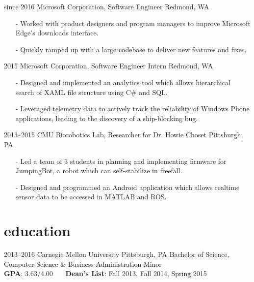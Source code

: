 \documentclass[]{friggeri-cv}
\begin{document}
    \begin{entrylist}
        \entrys
            {since 2016}
            {Microsoft Corporation, {\normalfont Software Engineer}}
            {Redmond, WA}
            {\begin{itemize}[leftmargin=*]
                \item[-] Worked with product designers and program managers to improve Microsoft Edge's downloads interface.
                \item[-] Quickly ramped up with a large codebase to deliver new features and fixes.
             \end{itemize}}
        \entrys
            {2015}
            {Microsoft Corporation, {\normalfont Software Engineer Intern}}
            {Redmond, WA}
            {\begin{itemize}[leftmargin=*]
                \item[-] Designed and implemented an analytics tool which allows hierarchical search of XAML file structure using C\# and SQL.
                \item[-] Leveraged telemetry data to actively track the reliability of Windows Phone applications, leading to the discovery of a ship-blocking bug.
             \end{itemize}}
        \entrys
            {2013--2015}
            {CMU Biorobotics Lab, {\normalfont Researcher for Dr. Howie Choset}}
            {Pittsburgh, PA}
            {\begin{itemize}[leftmargin=*]
                \item[-] Led a team of 3 students in planning and implementing firmware for JumpingBot, a robot which can self-stabilize in freefall.
                \item[-] Designed and programmed an Android application which allows realtime sensor data to be accessed in MATLAB and ROS.
            \end{itemize}}
    \end{entrylist}

    \section{education}

    \begin{entrylist}
        \entry
            {2013--2016}
            {Carnegie Mellon University}
            {Pittsburgh, PA}
            {Bachelor of Science, Computer Science \& Business Administration Minor\\
            \textbf{GPA}: 3.63/4.00 \ \ \ \textbf{Dean's List}: Fall 2013, Fall 2014, Spring 2015}
    \end{entrylist}
\end{document}
